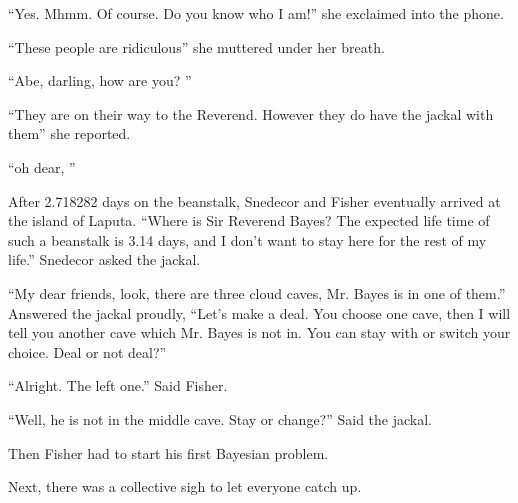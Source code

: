 \documentclass{article}
\begin{document}
``Yes. Mhmm. Of course. Do you know who I am!'' she exclaimed into the phone. 

``These people are ridiculous'' she muttered under her breath. 

``Abe, darling, how are you? ''

``They are on their way to the Reverend. However they do have the jackal with them'' she reported.

``oh dear, ''


After 2.718282 days on the beanstalk, Snedecor and Fisher eventually arrived at the island of Laputa. 
``Where is Sir Reverend Bayes? The expected life time of such a beanstalk is 3.14 days, 
and I don't want to stay here for the rest of my life.'' Snedecor asked the jackal.

``My dear friends, look, there are three cloud caves, Mr. Bayes is in one of them.'' Answered the jackal proudly,
``Let's make a deal. You choose one cave, then I will tell you another cave which Mr. Bayes is not in.
You can stay with or switch your choice. Deal or not deal?''

``Alright. The left one.'' Said Fisher.

``Well, he is not in the middle cave. Stay or change?'' Said the jackal.

Then Fisher had to start his first Bayesian problem.


Next, there was a collective sigh to let everyone catch up.
\end{document}
